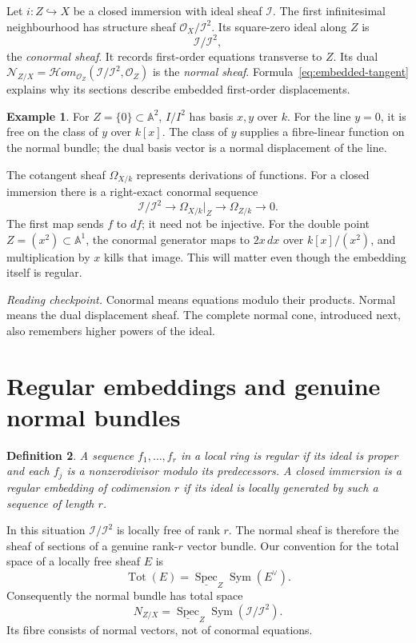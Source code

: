 \documentclass[11pt,a4paper]{article}
\numberwithin{equation}{section}
\newtheorem{definition}{Definition}[section]
\theoremstyle{definition}
\newtheorem{example}[definition]{Example}
\newcommand{\A}{\mathbb A}
\newcommand{\OO}{\mathcal O}
\newcommand{\Spec}{\operatorname{Spec}}
\newcommand{\Sym}{\operatorname{Sym}}
\newcommand{\Tot}{\operatorname{Tot}}
\newcommand{\reading}[1]{\par\smallskip\textit{Reading checkpoint.} #1\par}
\begin{document}
Let $i:Z\hookrightarrow X$ be a closed immersion with ideal sheaf
$\mathcal I$. The first infinitesimal neighbourhood has structure
sheaf $\OO_X/\mathcal I^2$. Its square-zero ideal along $Z$ is
\[
\mathcal I/\mathcal I^2,
\]
the \emph{conormal sheaf}. It records first-order equations transverse
to $Z$. Its dual
$\mathcal N_{Z/X}=\mathcal Hom_{\OO_Z}(\mathcal I/\mathcal I^2,\OO_Z)$
is the \emph{normal sheaf}. Formula~\eqref{eq:embedded-tangent} explains
why its sections describe embedded first-order displacements.

\begin{example}
For $Z=\{0\}\subset\A^2$, $I/I^2$ has basis $x,y$ over $k$.
For the line $y=0$, it is free on the class of $y$ over $k[x]$.
The class of $y$ supplies a fibre-linear function on the normal bundle;
the dual basis vector is a normal displacement of the line.
\end{example}

The cotangent sheaf $\Omega_{X/k}$ represents derivations of functions.
For a closed immersion there is a right-exact conormal sequence
\begin{equation}\label{eq:conormal-sequence}
\mathcal I/\mathcal I^2\longrightarrow
\Omega_{X/k}|_Z\longrightarrow\Omega_{Z/k}\longrightarrow0.
\end{equation}
The first map sends $f$ to $df$; it need not be injective. For the
double point $Z=(x^2)\subset\A^1$, the conormal generator maps to
$2x\,dx$ over $k[x]/(x^2)$, and multiplication by $x$ kills that image.
This will matter even though the embedding itself is regular.

\reading{Conormal means equations modulo their products. Normal means
the dual displacement sheaf. The complete normal cone, introduced next,
also remembers higher powers of the ideal.}

\section{Regular embeddings and genuine normal bundles}
\label{sec:regular}

\begin{definition}
A sequence $f_1,\ldots,f_r$ in a local ring is regular if its ideal is
proper and each $f_j$ is a nonzerodivisor modulo its predecessors.
A closed immersion is a regular embedding of codimension $r$ if its
ideal is locally generated by such a sequence of length $r$.
\end{definition}

In this situation $\mathcal I/\mathcal I^2$ is locally free of rank
$r$. The normal sheaf is therefore the sheaf of sections of a genuine
rank-$r$ vector bundle. Our convention for the total space of a locally
free sheaf $E$ is
\[
\Tot(E)=\underline{\Spec}_Z\Sym(E^\vee).
\]
Consequently the normal bundle has total space
\begin{equation}\label{eq:normal-total}
N_{Z/X}=\underline{\Spec}_Z\Sym(\mathcal I/\mathcal I^2).
\end{equation}
Its fibre consists of normal vectors, not of conormal equations.
\end{document}

